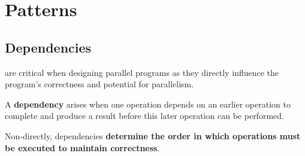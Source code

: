 \section{Patterns}

\subsection{Dependencies}

 are critical when designing parallel programs as they directly influence the program's correctness and potential for parallelism.

\begin{definitionbox}
    A \textbf{dependency} arises when one operation depends on an earlier operation to complete and produce a result before this later operation can be performed.
\end{definitionbox}

\noindent
Non-directly, dependencies \textbf{determine the order in which operations must be executed to maintain correctness}.

